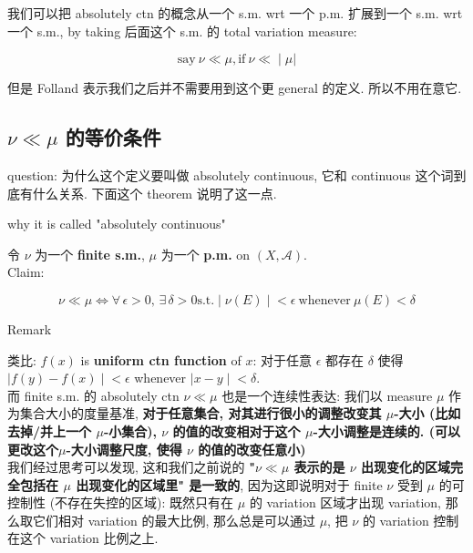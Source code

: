 \documentclass{qlnotes-export}
\begin{document}
我们可以把 absolutely ctn 的概念从一个 s.m. wrt 一个 p.m. 扩展到一个 s.m. wrt 一个 s.m., by taking 后面这个 s.m. 的 total variation measure:

\[\left. \text{say}\ \nu \ll \mu,\text{if}\ \nu \ll \middle| \mu| \right.\]

但是 Folland 表示我们之后并不需要用到这个更 general 的定义. 所以不用在意它.

\subsection{\texorpdfstring{\(\nu \ll \mu\) 的等价条件}{\textbackslash nu \textbackslash ll \textbackslash mu 的等价条件}}\label{nu-ll-mu-ux7684ux7b49ux4ef7ux6761ux4ef6}

question: 为什么这个定义要叫做 absolutely continuous, 它和 continuous 这个词到底有什么关系. 下面这个 theorem 说明了这一点.

\begin{theorem}{why it is called "absolutely continuous"}\label{thm-11-radon-nikodym-theorem-why-it-is-called-absolutely-continuous}

令 \(\nu\) 为一个 \textbf{finite s.m.}, \(\mu\) 为一个 \textbf{p.m.} on \((X,\mathcal{A})\).\\
Claim:

\[\left. \nu \ll \mu\Leftrightarrow\forall\,\epsilon > 0,\,\exists\,\delta > 0\text{s.t.} \middle| \nu(E) \middle| < \epsilon\ \text{whenever}\ \mu(E) < \delta \right.\]

\end{theorem}

\begin{qlremark}{Remark}

类比: \(f(x)\) is \textbf{uniform ctn function} of \(x\): 对于任意 \(\epsilon\) 都存在 \(\delta\) 使得 \(\left. |f(y) - f(x) \middle| < \epsilon \right.\) whenever \(\left. |x - y \middle| < \delta \right.\).\\
而 finite s.m. 的 absolutely ctn \(\nu \ll \mu\) 也是一个连续性表达: 我们以 measure \(\mu\) 作为集合大小的度量基准, \textbf{对于任意集合, 对其进行很小的调整改变其 \(\mu\)-大小 (比如去掉/并上一个 \(\mu\)-小集合), \(\nu\) 的值的改变相对于这个 \(\mu\)-大小调整是连续的. (可以更改这个\(\mu\)-大小调整尺度, 使得 \(\nu\) 的值的改变任意小)}\\
我们经过思考可以发现, 这和我们之前说的 \textbf{"\(\nu \ll \mu\) 表示的是 \(\nu\) 出现变化的区域完全包括在 \(\mu\) 出现变化的区域里" 是一致的}, 因为这即说明对于 finite \(\nu\) 受到 \(\mu\) 的可控制性 (不存在失控的区域): 既然只有在 \(\mu\) 的 variation 区域才出现 variation, 那么取它们相对 variation 的最大比例, 那么总是可以通过 \(\mu\), 把 \(\nu\) 的 variation 控制在这个 variation 比例之上.

\end{qlremark}
\end{document}
